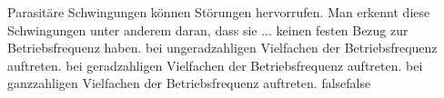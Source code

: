     {Parasitäre Schwingungen können Störungen hervorrufen. Man erkennt diese Schwingungen unter anderem daran, dass sie ...}
    {keinen festen Bezug zur Betriebsfrequenz haben.}
    {bei ungeradzahligen Vielfachen der Betriebsfrequenz auftreten.}
    {bei geradzahligen Vielfachen der Betriebsfrequenz auftreten.}
    {bei ganzzahligen Vielfachen der Betriebsfrequenz auftreten.}
    {false}{false}